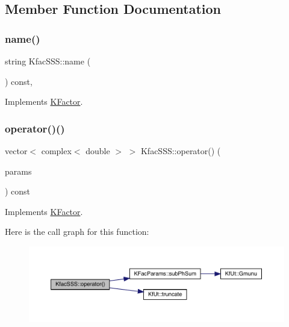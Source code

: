\subsection{Member Function Documentation}
\mbox{\label{classKfacSSS_a2c22369b8bb0ac1be72f981c8c119719}} 
\subsubsection{\texorpdfstring{name()}{name()}}
{\footnotesize\ttfamily string Kfac\+S\+S\+S\+::name (\begin{DoxyParamCaption}{ }\end{DoxyParamCaption}) const\hspace{0.3cm}{\ttfamily [inline]}, {\ttfamily [virtual]}}



Implements \mbox{\hyperlink{classKFactor_ae578f8d6e4b525895427717da99cab6c}{K\+Factor}}.

\mbox{\label{classKfacSSS_a25ca7daf4005bf951ad67d568e3f3936}} 
\subsubsection{\texorpdfstring{operator()()}{operator()()}}
{\footnotesize\ttfamily vector$<$ complex$<$ double $>$ $>$ Kfac\+S\+S\+S\+::operator() (\begin{DoxyParamCaption}\item[{const \mbox{\hyperlink{classKFacParams}{K\+Fac\+Params}} \&}]{params }\end{DoxyParamCaption}) const\hspace{0.3cm}{\ttfamily [virtual]}}



Implements \mbox{\hyperlink{classKFactor_a012aae9ff4a07eab86d5d50b7f774285}{K\+Factor}}.

Here is the call graph for this function\+:
\nopagebreak
\begin{figure}[H]
\begin{center}
\leavevmode
\includegraphics[width=350pt]{d9/d96/classKfacSSS_a25ca7daf4005bf951ad67d568e3f3936_cgraph}
\end{center}
\end{figure}


